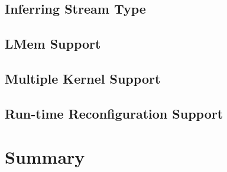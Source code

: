 \subsection{Inferring Stream Type}
\subsection{LMem Support}
\subsection{Multiple Kernel Support}
\subsection{Run-time Reconfiguration Support}

\section{Summary}
